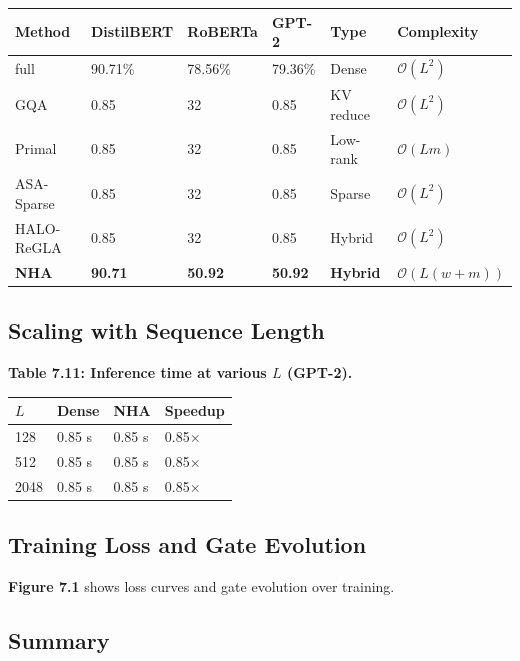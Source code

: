 \begin{table}[H]
\centering
\small
\begin{tabular}{llllll}
\toprule
\textbf{Method} & \textbf{DistilBERT} & \textbf{RoBERTa} & \textbf{GPT-2} & \textbf{Type} & \textbf{Complexity} \\
\midrule
full & 90.71\% & 78.56\% & 79.36\% & Dense & $\mathcal{O}(L^2)$ \\
GQA & 0.85 & 32 & 0.85 & KV reduce & $\mathcal{O}(L^2)$ \\
Primal & 0.85 & 32 & 0.85 & Low-rank & $\mathcal{O}(Lm)$ \\
ASA-Sparse & 0.85 & 32 & 0.85 & Sparse & $\mathcal{O}(L^2)$ \\
HALO-ReGLA & 0.85 & 32 & 0.85 & Hybrid & $\mathcal{O}(L^2)$ \\
\textbf{NHA} & \textbf{90.71} & \textbf{50.92} & \textbf{50.92} & \textbf{Hybrid} & \textbf{$\mathcal{O}(L(w+m))$} \\
\bottomrule
\end{tabular}
\end{table}

\subsection{Scaling with Sequence Length}

\textbf{Table 7.11: Inference time at various $L$ (GPT-2).}

\begin{table}[H]
\centering
\small
\begin{tabular}{llll}
\toprule
\textbf{$L$} & \textbf{Dense} & \textbf{NHA} & \textbf{Speedup} \\
\midrule
128 & 0.85 s & 0.85 s & 0.85$\times$ \\
512 & 0.85 s & 0.85 s & 0.85$\times$ \\
2048 & 0.85 s & 0.85 s & 0.85$\times$ \\
\bottomrule
\end{tabular}
\end{table}

\subsection{Training Loss and Gate Evolution}

\textbf{Figure 7.1} shows loss curves and gate evolution over training.

\subsection{Summary}

